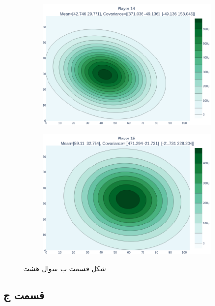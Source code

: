 \documentclass[14pt,a4]{article}
\begin{document}
\begin{figure}[h]
\begin{subfigure}{0.3\linewidth}
    \end{subfigure}
    \newline
    \hfill
    \begin{subfigure}{0.3\linewidth}
        \centering
        \includegraphics[scale=0.1]{images/q6/partb/14.png}
    \end{subfigure}
    \hfill
    \begin{subfigure}{0.3\linewidth}
        \centering
        \includegraphics[scale=0.1]{images/q6/partb/15.png}
    \end{subfigure}
    \hfill
    \caption{شکل قسمت ب سوال هشت}
    \label{normal-distribution-of-the-players-in-the-game}
\end{figure}

\subsection*{قسمت ج}
\end{document}
